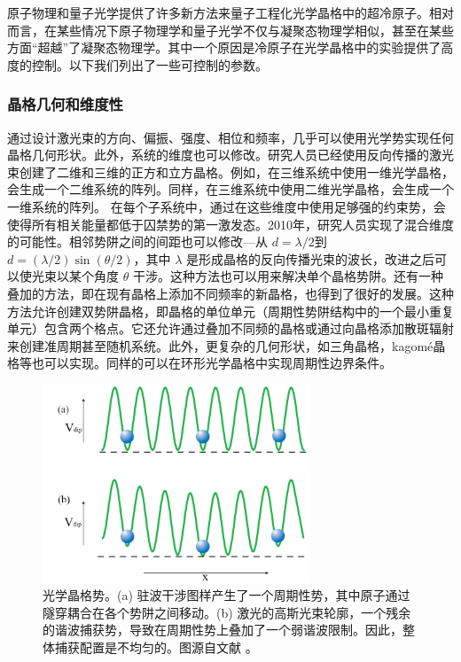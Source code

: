原子物理和量子光学提供了许多新方法来量子工程化光学晶格中的超冷原子。相对而言，在某些情况下原子物理学和量子光学不仅与凝聚态物理学相似，甚至在某些方面“超越”了凝聚态物理学。其中一个原因是冷原子在光学晶格中的实验提供了高度的控制。以下我们列出了一些可控制的参数。
\subsubsection{晶格几何和维度性}
通过设计激光束的方向、偏振、强度、相位和频率，几乎可以使用光学势实现任何晶格几何形状。此外，系统的维度也可以修改。研究人员已经使用反向传播的激光束创建了二维和三维的正方和立方晶格。例如，在三维系统中使用一维光学晶格，会生成一个二维系统的阵列。同样，在三维系统中使用二维光学晶格，会生成一个一维系统的阵列\cite{bloch2008many,petrov2004low,hadzibabic2006berezinskii,griffin1996bose}。
在每个子系统中，通过在这些维度中使用足够强的约束势，会使得所有相关能量都低于囚禁势的第一激发态\cite{griffin1996bose}。2010年，研究人员实现了混合维度的可能性\cite{lamporesi2010scattering}。相邻势阱之间的间距也可以修改—从 \(d = \lambda/2\)到 \(d = (\lambda/2) \sin(\theta/2)\)，其中 \(\lambda\) 是形成晶格的反向传播光束的波长，改进之后可以使光束以某个角度 \(\theta\) 干涉。这种方法也可以用来解决单个晶格势阱。还有一种叠加的方法，即在现有晶格上添加不同频率的新晶格，也得到了很好的发展。这种方法允许创建双势阱晶格，即晶格的单位单元（周期性势阱结构中的一个最小重复单元）包含两个格点。它还允许通过叠加不同频的晶格或通过向晶格添加散斑辐射来创建准周期甚至随机系统\cite{fallani2008bose,bouyer2009anderson,clement2008density,dagnino2009vortex}。此外，更复杂的几何形状，如三角晶格，kagomé晶格等也可以实现\cite{becker2010ultracold,clement2008density}。同样的可以在环形光学晶格中实现周期性边界条件。

\begin{figure}
\centering
\includegraphics[width=8cm]{figures/chap01/lattice_potential.png}
\vspace{-10pt}
\caption{  光学晶格势。(a) 驻波干涉图样产生了一个周期性势，其中原子通过隧穿耦合在各个势阱之间移动。(b) 激光的高斯光束轮廓，一个残余的谐波捕获势，导致在周期性势上叠加了一个弱谐波限制。因此，整体捕获配置是不均匀的。图源自文献 \cite{bloch2005ultracold}。}
\label{fig:lattice_potential}
\end{figure}

